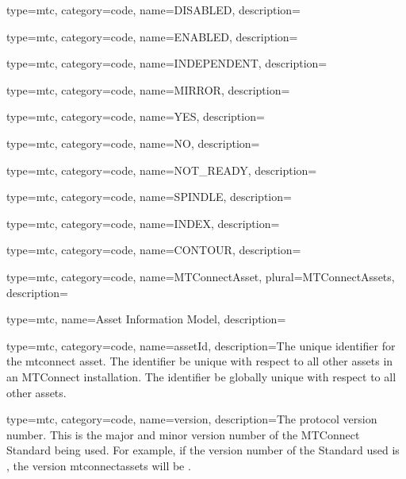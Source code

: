 {
  type=mtc,
  category=code,
  name={DISABLED},
  description={}
}

{
  type=mtc,
  category=code,
  name={ENABLED},
  description={}
}

{
  type=mtc,
  category=code,
  name={INDEPENDENT},
  description={}
}

{
  type=mtc,
  category=code,
  name={MIRROR},
  description={}
}

{
  type=mtc,
  category=code,
  name={YES},
  description={}
}

{
  type=mtc,
  category=code,
  name={NO},
  description={}
}

{
  type=mtc,
  category=code,
  name={NOT\_READY},
  description={}
}

{
  type=mtc,
  category=code,
  name={SPINDLE},
  description={}
}

{
  type=mtc,
  category=code,
  name={INDEX},
  description={}
}

{
  type=mtc,
  category=code,
  name={CONTOUR},
  description={}
}






{
  type=mtc,
  category=code,
  name={MTConnectAsset},
  plural={MTConnectAssets},
  description={}
}

{
  type=mtc,
  name={Asset Information Model},
  description={}
}

{
  type=mtc,
  category=code,
  name={assetId},
  description={The unique identifier for the \gls{mtconnect asset}. The identifier \MUST be unique with respect to all other \glspl{asset} in an MTConnect installation. The identifier \SHOULD be globally unique with respect to all other \glspl{asset}.}
}

{
  type=mtc,
  category=code,
  name={version},
  description={The protocol version number. This is the \gls{major} and \gls{minor} version number of the MTConnect Standard being used. For example, if the version number of the Standard used is , the \gls{version mtconnectassets} will be .}
}

